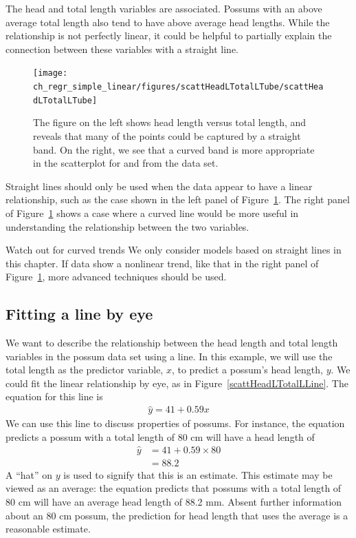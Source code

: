 The head and total length variables are associated. Possums with an above average total length also tend to have above average head lengths. While the relationship is not perfectly linear, it could be helpful to partially explain the connection between these variables with a straight line.

\begin{figure}
   \centering
   \texttt{[image: ch\_regr\_simple\_linear/figures/scattHeadLTotalLTube/scattHeadLTotalLTube]}
   \caption{The figure on the left shows head length versus total length, and reveals that many of the points could be captured by a straight band. On the right, we see that a curved band is more appropriate in the scatterplot for  and  from the  data set.}
   \label{scattHeadLTotalLTube}
\end{figure}

Straight lines should only be used when the data appear to have a linear relationship, such as the case shown in the left panel of Figure~\ref{scattHeadLTotalLTube}. The right panel of Figure~\ref{scattHeadLTotalLTube} shows a case where a curved line would be more useful in understanding the relationship between the two variables.

\begin{caution}{Watch out for curved trends}
{We only consider models based on straight lines in this chapter. If data show a nonlinear trend, like that in the right panel of Figure~\ref{scattHeadLTotalLTube}, more advanced techniques should be used.\vspace{0.7mm}}
\end{caution}

\subsection{Fitting a line by eye}

We want to describe the relationship between the head length and total length variables in the possum data set using a line. In this example, we will use the total length as the predictor variable, $x$, to predict a possum's head length, $y$. We could fit the linear relationship by eye, as in Figure~\ref{scattHeadLTotalLLine}. The equation for this line is
\begin{eqnarray}
\hat{y} = 41 + 0.59x
\label{headLLinModTotalL}
\end{eqnarray}
We can use this line to discuss properties of possums. For instance, the equation predicts a possum with a total length of 80 cm will have a head length of
\begin{align*}
\hat{y} &= 41 + 0.59\times 80 \\
	&= 88.2 %
\end{align*}
A ``hat'' on $y$ is used to signify that this is an estimate. This estimate may be viewed as an average: the equation predicts that possums with a total length of 80 cm will have an average head length of 88.2 mm. Absent further information about an 80 cm possum, the prediction for head length that uses the average is a reasonable estimate.


